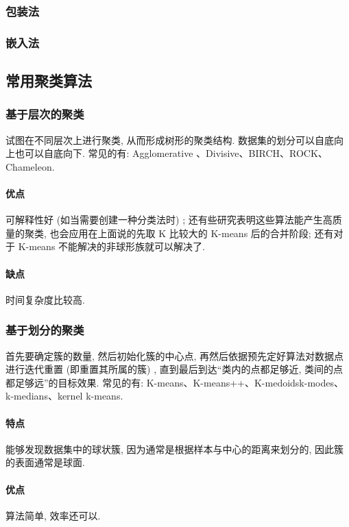 \subsubsection{包装法}

\subsubsection{嵌入法}

\subsection{常用聚类算法}

\subsubsection{基于层次的聚类}
试图在不同层次上进行聚类, 从而形成树形的聚类结构. 数据集的划分可以自底向上也可以自底向下. 常见的有: Agglomerative 、Divisive、BIRCH、ROCK、Chameleon. 

\paragraph{优点}可解释性好 (如当需要创建一种分类法时) ; 还有些研究表明这些算法能产生高质量的聚类, 也会应用在上面说的先取 K 比较大的 K-means 后的合并阶段; 还有对于 K-means 不能解决的非球形族就可以解决了.  

\paragraph{缺点}时间复杂度比较高. 

\subsubsection{基于划分的聚类}
首先要确定簇的数量, 然后初始化簇的中心点, 再然后依据预先定好算法对数据点进行迭代重置 (即重置其所属的簇) , 直到最后到达“类内的点都足够近, 类间的点都足够远”的目标效果. 常见的有: K-means、K-means++、K-medoidsk-modes、k-medians、kernel k-means. 

\paragraph{特点}能够发现数据集中的球状簇, 因为通常是根据样本与中心的距离来划分的, 因此簇的表面通常是球面. 

\paragraph{优点}算法简单, 效率还可以. 

